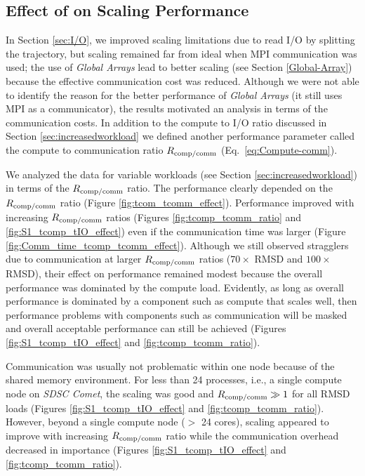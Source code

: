 
\subsection{Effect of \Rcompcomm on Scaling Performance}
\label{sec:tcomm}

In Section \ref{sec:I/O}, we improved scaling limitations due to read I/O by splitting the trajectory, but scaling remained far from ideal when MPI communication was used; the use of \emph{Global Arrays} lead to better scaling (see Section \ref{Global-Array}) because the effective communication cost was reduced.
Although we were not able to identify the reason for the better performance of \emph{Global Arrays} (it still uses MPI as a communicator), the results motivated an analysis in terms of the communication costs.
In addition to the compute to I/O ratio \RcompIO discussed in Section \ref{sec:increasedworkload} we defined another performance parameter called the compute to communication ratio $R_{\text{comp/comm}}$ (Eq.~\ref{eq:Compute-comm}).

We analyzed the data for variable workloads (see Section \ref{sec:increasedworkload}) in terms of the $R_{\text{comp/comm}}$ ratio.
The performance clearly depended on the $R_{\text{comp/comm}}$ ratio (Figure \ref{fig:tcom_tcomm_effect}).
Performance improved with increasing $R_{\text{comp/comm}}$ ratios (Figures \ref{fig:tcomp_tcomm_ratio} and \ref{fig:S1_tcomp_tIO_effect}) even if the communication time was larger (Figure \ref{fig:Comm_time_tcomp_tcomm_effect}).
Although we still observed stragglers due to communication at larger $R_{\text{comp/comm}}$ ratios ($70\times$ RMSD and $100\times$ RMSD), their effect on performance remained modest because the overall performance was dominated by the compute load. 
Evidently, as long as overall performance is dominated by a component such as compute that scales well, then performance problems with components such as communication will be masked and overall acceptable performance can still be achieved (Figures \ref{fig:S1_tcomp_tIO_effect} and \ref{fig:tcomp_tcomm_ratio}).

Communication was usually not problematic within one node because of the shared memory environment.
For less than 24 processes, i.e., a single compute node on \emph{SDSC Comet}, the scaling was good and $R_{\text{comp/comm}} \gg 1$ for all RMSD loads (Figures \ref{fig:S1_tcomp_tIO_effect} and \ref{fig:tcomp_tcomm_ratio}).
However, beyond a single compute node ($>$ 24 cores), scaling appeared to improve with increasing $R_{\text{comp/comm}}$ ratio while the communication overhead decreased in importance (Figures \ref{fig:S1_tcomp_tIO_effect} and \ref{fig:tcomp_tcomm_ratio}).

